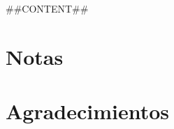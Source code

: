 \documentclass[12pt,twoside,openright,a5paper]{book}
\begin{document}
##CONTENT##

\vspace{0.5cm}
\hrulefill\hspace{0.2cm} \decofourright\decofourleft \hspace{0.2cm} \hrulefill

\cleardoublepage



\cleardoublepage

\section*{Notas}



\cleardoublepage

\section*{Agradecimientos}


\end{document}
